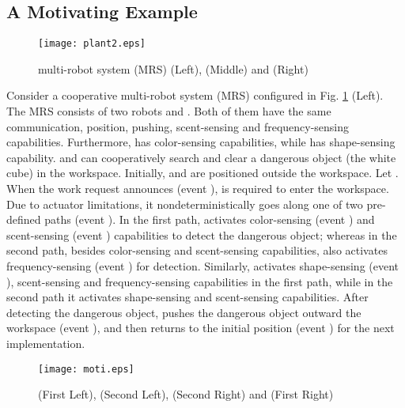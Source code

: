 \documentclass[preprint,authoryear,12pt]{elsarticle}
\begin{document}
\subsection{A Motivating Example}

\begin{figure}[!htb]
\begin{center}
\texttt{[image: plant2.eps]}
\caption{ multi-robot system (MRS) (Left),  (Middle) and
(Right)} \label{plantdet}
\end{center}
\end{figure}
Consider a cooperative multi-robot system (MRS) configured in Fig.
\ref{plantdet} (Left). The MRS consists of two robots  and
. Both of them have the same communication, position,
pushing, scent-sensing and frequency-sensing capabilities.
Furthermore,  has color-sensing capabilities, while  has
shape-sensing capability.  and  can cooperatively search
and clear a dangerous object (the white cube) in the workspace.
Initially,  and  are positioned outside the workspace.
Let . When the work request announces (event ), 
is required to enter the workspace. Due to actuator limitations,
it nondeterministically goes along one of two pre-defined paths
(event ). In the first path,  activates color-sensing
(event ) and scent-sensing (event ) capabilities to detect
the dangerous object; whereas in the second path, besides
color-sensing and scent-sensing capabilities,  also activates
frequency-sensing (event ) for detection. Similarly, 
activates shape-sensing (event ), scent-sensing and
frequency-sensing capabilities in the first path, while in the
second path it activates shape-sensing and scent-sensing
capabilities. After detecting the dangerous object,  pushes
the dangerous object outward the workspace (event ), and then
returns to the initial position (event ) for the next
implementation.

\begin{figure}[!htb]
\begin{center}
\texttt{[image: moti.eps]}
\caption{ (First Left),  (Second Left),  (Second
Right) and  (First Right)} \label{spec}
\end{center}
\end{figure}
\end{document}
